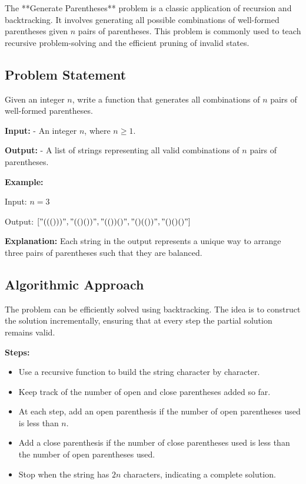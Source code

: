 
\label{problem:Generate_Parentheses}

The **Generate Parentheses** problem is a classic application of recursion and backtracking. It involves generating all possible combinations of well-formed parentheses given \( n \) pairs of parentheses. This problem is commonly used to teach recursive problem-solving and the efficient pruning of invalid states.

\subsection*{Problem Statement}
Given an integer \( n \), write a function that generates all combinations of \( n \) pairs of well-formed parentheses.

\textbf{Input:}
- An integer \( n \), where \( n \geq 1 \).

\textbf{Output:}
- A list of strings representing all valid combinations of \( n \) pairs of parentheses.

\textbf{Example:}

Input: \( n = 3 \)

Output: \([ "((()))", "(()())", "(())()", "()(())", "()()()" ]\)

\textbf{Explanation:} Each string in the output represents a unique way to arrange three pairs of parentheses such that they are balanced.

\subsection*{Algorithmic Approach}
The problem can be efficiently solved using backtracking. The idea is to construct the solution incrementally, ensuring that at every step the partial solution remains valid.

\textbf{Steps:}
\begin{itemize}
    \item Use a recursive function to build the string character by character.
    \item Keep track of the number of open and close parentheses added so far.
    \item At each step, add an open parenthesis if the number of open parentheses used is less than \( n \).
    \item Add a close parenthesis if the number of close parentheses used is less than the number of open parentheses used.
    \item Stop when the string has \( 2n \) characters, indicating a complete solution.
\end{itemize}

